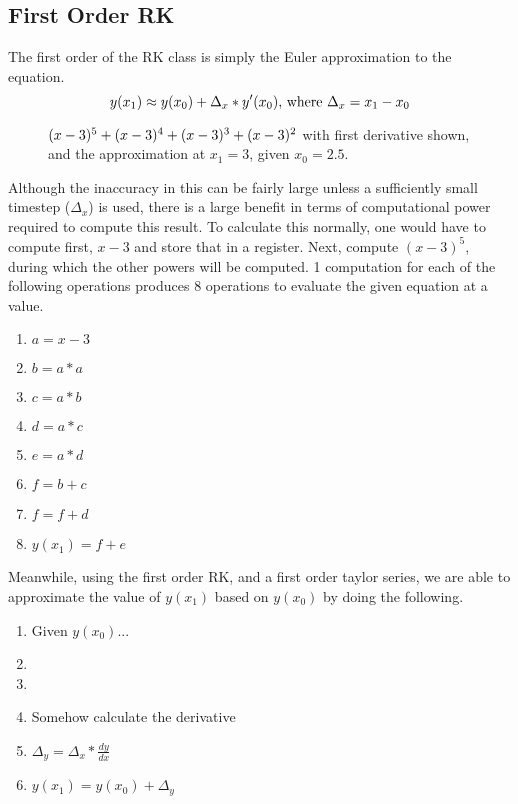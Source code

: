 \documentclass[letterpaper,12pt]{article} %
\begin{document}
\subsection{First Order RK}
The first order of the RK class is simply the Euler approximation to the equation. 
\[y(x_1) \approx y(x_0) + \Delta_x * y'(x_0) \text{, where } \Delta_x = x_1 - x_0\]
\begin{figure}[H]
  \centering
\caption{\((x-3)^5 + (x-3)^4 + (x-3)^3 + (x-3)^2\) with first derivative shown, and the approximation at \(x_1 = 3\), given \(x_0 = 2.5\).}
\end{figure}

Although the inaccuracy in this can be fairly large unless a sufficiently small timestep (\(\Delta_x\)) is used, there is a large benefit in terms of computational power required to compute this result. 
To calculate this normally, one would have to compute first, \(x-3\) and store that in a register. 
Next, compute \((x-3)^5\), during which the other powers will be computed.
1 computation for each of the following operations produces 8 operations to evaluate the given equation at a value.
\begin{enumerate}
  \item \(a = x-3\)
  \item \(b = a*a\)
  \item \(c = a*b\)
  \item \(d = a*c\)
  \item \(e = a*d\)
  \item \(f = b + c\)
  \item \(f = f + d\)
  \item \(y(x_1) = f + e\)
\end{enumerate}

Meanwhile, using the first order RK, and a first order taylor series, we are able to approximate the value of \(y(x_1)\) based on \(y(x_0)\) by doing the following.
\begin{enumerate}
  \item Given \(y(x_0)\)... 
  \item {}
  \item {}
  \item Somehow calculate the derivative
  \item \(\Delta_y = \Delta_x * \frac{dy}{dx}\)
  \item \(y(x_1) = y(x_0) + \Delta_y\)
\end{enumerate}
\end{document}
